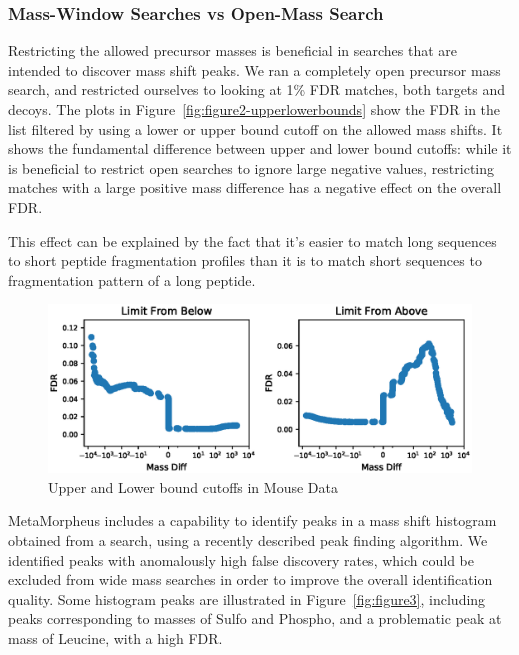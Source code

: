 \documentclass[journal=jprobs,manuscript=article]{achemso}
\begin{document}
\subsubsection{Mass-Window Searches vs Open-Mass Search}

Restricting the allowed precursor masses is beneficial in searches that are intended to discover mass shift peaks.
We ran a completely open precursor mass search, and restricted ourselves to looking at 1\% FDR matches, both targets and decoys.
The plots in Figure~\ref{fig:figure2-upperlowerbounds} show the FDR in the list filtered by using a lower or upper bound cutoff on the allowed mass shifts.
It shows the fundamental difference between upper and lower bound cutoffs: while it is beneficial to restrict open searches to ignore large negative values, restricting matches with a large positive mass difference has a negative effect on the overall FDR.

This effect can be explained by the fact that it's easier to match long sequences to short peptide fragmentation profiles than it is to match short sequences to fragmentation pattern of a long peptide.

\begin{figure}
\caption{Upper and Lower bound cutoffs in Mouse Data}
\label{fig:fig4-limitsOnOpenSearch}
\includegraphics{fig4-limitsOnOpenSearch}
\end{figure}

MetaMorpheus includes a capability to identify peaks in a mass shift histogram obtained from a search, using a recently described peak finding algorithm\cite{Rodriguez_2014}.
We identified peaks with anomalously high false discovery rates, which could be excluded from wide mass searches in order to improve the overall identification quality.
Some histogram peaks are illustrated in Figure~\ref{fig:figure3}, including peaks corresponding to masses of Sulfo and Phospho, and a problematic peak at mass of Leucine, with a high FDR.
\end{document}
